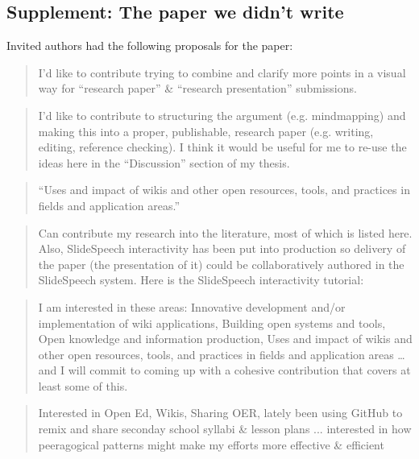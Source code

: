 \begin{cframed}[scarlet]
\section{Supplement: The paper we didn't write}

Invited authors had the following proposals for the paper:

\begin{quote}
I'd like to contribute trying to combine and clarify more points in a
visual way for ``research paper'' \& ``research presentation''
submissions.
\end{quote}

\begin{quote}
I'd like to contribute to structuring the argument (e.g. mindmapping)
and making this into a proper, publishable, research paper
(e.g. writing, editing, reference checking). I think it would be
useful for me to re-use the ideas here in the ``Discussion'' section
of my thesis.
\end{quote}

\begin{quote}
``Uses and impact of wikis and other open resources, tools, and
  practices in fields and application areas.''
\end{quote}

\begin{quote}
Can contribute my research into the literature, most of which is
listed here. Also, SlideSpeech interactivity has been put into
production so delivery of the paper (the presentation of it) could be
collaboratively authored in the SlideSpeech system. Here is the
SlideSpeech interactivity tutorial:
\end{quote}

\begin{quote}
I am interested in these areas: Innovative development and/or implementation of wiki applications, Building open systems and tools, Open knowledge and information production, Uses and impact of wikis and other open resources, tools, and practices in fields and application areas \ldots and I will commit to coming up with a cohesive contribution that covers at least some of this.
\end{quote}

\begin{quote}
Interested in Open Ed, Wikis, Sharing OER, lately been using GitHub to remix and share seconday school syllabi \& lesson plans ... interested in how peeragogical patterns might make my efforts more effective \& efficient
\end{quote}


\end{cframed}
